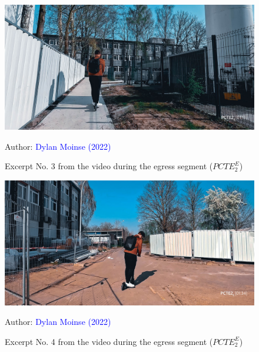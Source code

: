    \begin{figure}[h!]\vspace*{4pt}
        \caption*{Excerpt No. 3 from the video during the egress segment (\(PCTE^{E}_{2}\))}
        \centerline{\includegraphics[width=0.75\columnwidth]{src/Figures/Annexes/Extrait_Video_PCTE2_Egress_3.jpg}}
        \vspace{5pt}
        \begin{flushright}\scriptsize{
        Author: \textcolor{blue}{Dylan Moinse (2022)}
        }\end{flushright}
    \end{figure}

    \begin{figure}[h!]\vspace*{4pt}
        \caption*{Excerpt No. 4 from the video during the egress segment (\(PCTE^{E}_{2}\))}
        \centerline{\includegraphics[width=0.75\columnwidth]{src/Figures/Annexes/Extrait_Video_PCTE2_Egress_4.jpg}}
        \vspace{5pt}
        \begin{flushright}\scriptsize{
        Author: \textcolor{blue}{Dylan Moinse (2022)}
        }\end{flushright}
    \end{figure}

